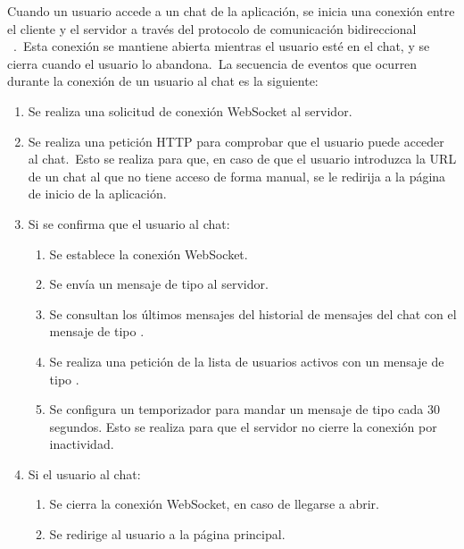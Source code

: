 
Cuando un usuario accede a un chat de la aplicación, se inicia una conexión entre el cliente y el servidor a través
del protocolo de comunicación bidireccional ~\cite{RFCWebSocket}.\ Esta conexión se mantiene
abierta mientras el
usuario esté en el chat, y se cierra cuando el usuario lo abandona.\ La secuencia de eventos que ocurren durante
la conexión de un usuario al chat es la siguiente:


\begin{enumerate}
	\item Se realiza una solicitud de conexión WebSocket al servidor.
	\item Se realiza una petición HTTP para comprobar que el usuario puede acceder al chat.\ Esto se realiza para
	que, en caso de que el usuario introduzca la URL de un chat al que no tiene acceso de forma manual, se le redirija
	a la página de inicio de la aplicación.
	\item Si se confirma que el usuario  al chat:
	\begin{enumerate}
		\item Se establece la conexión WebSocket.
		\item Se envía un mensaje de tipo  al servidor.
		\item Se consultan los últimos mensajes del historial de mensajes del chat con el mensaje de tipo
		.
		\item Se realiza una petición de la lista de usuarios activos con un mensaje de tipo
		.
		\item Se configura un temporizador para mandar un mensaje de tipo  cada 30 segundos.
		Esto se realiza para que el servidor no cierre la conexión por inactividad.
	\end{enumerate}
	\item Si el usuario  al chat:
	\begin{enumerate}
		\item Se cierra la conexión WebSocket, en caso de llegarse a abrir.
		\item Se redirige al usuario a la página principal.
	\end{enumerate}
\end{enumerate}
\label{itm:frontend-connection-life-cycle}

